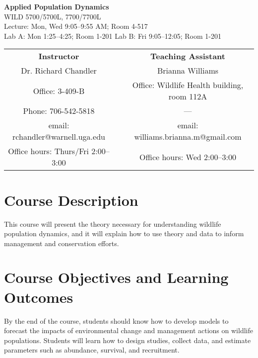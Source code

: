 \documentclass[11pt]{article}
\begin{document}
\begin{center}

{%
  \huge \bf \sc 
  Applied Population Dynamics \\}
{\large 
  WILD 5700/5700L, 7700/7700L  \\
  Lecture: Mon, Wed 9:05--9:55 AM; Room 4-517 \\
  Lab A: Mon 1:25--4:25; Room 1-201
  Lab B: Fri 9:05--12:05; Room 1-201
}

\large

\vspace{0.5cm}

\begin{tabular}[h!]{ccc}
\textbf{Instructor}                 & \hspace{1.5cm} & \textbf{Teaching Assistant} \\
Dr. Richard Chandler                & & Brianna Williams \\
Office: 3-409-B                     & & Office: Wildlife Health building, room 112A  \\
Phone: 706-542-5818                 & & --- \\
email: rchandler@warnell.uga.edu    & & email: williams.brianna.m@gmail.com \\
Office hours: Thurs/Fri 2:00--3:00  & & Office hours: Wed 2:00--3:00 \\
\end{tabular}
\end{center}


\normalsize


\vspace{-3mm}
\section*{Course Description}
\vspace{-5mm}
This course will present the theory necessary for understanding
wildlife population dynamics, and it will explain how to use theory
and data to inform management and conservation efforts. 

\vspace{-5mm}
\section*{Course Objectives and Learning Outcomes}
\vspace{-5mm}
By the end of the course, students should know how to develop models
to forecast the impacts of environmental change and management actions
on wildlife populations. Students will learn how to design studies,
collect data, and estimate parameters such as abundance,
survival, and recruitment.
\end{document}
